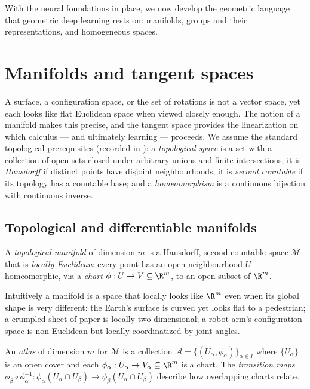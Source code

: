 With the neural foundations in place, we now develop the geometric language that
geometric deep learning rests on: manifolds, groups and their representations,
and homogeneous spaces.

\section{Manifolds and tangent spaces}
\label{sec:found:manifolds}

A surface, a configuration space, or the set of rotations is not a vector space,
yet each looks like flat Euclidean space when viewed closely enough. The notion
of a manifold makes this precise, and the tangent space provides the
linearization on which calculus --- and ultimately learning --- proceeds. We
assume the standard topological prerequisites (recorded in ): a
\emph{topological space} is a set with a collection of open sets closed under
arbitrary unions and finite intersections; it is \emph{Hausdorff} if distinct
points have disjoint neighbourhoods; it is \emph{second countable} if its
topology has a countable base; and a \emph{homeomorphism} is a continuous
bijection with continuous inverse.

\subsection{Topological and differentiable manifolds}
\label{sec:found:diff-manifolds}

\begin{definition}
\label{def:found:topmanifold}
A \emph{topological manifold} of dimension $m$ is a Hausdorff, second-countable
space $\mathcal{M}$ that is \emph{locally Euclidean}: every point has an open
neighbourhood $U$ homeomorphic, via a \emph{chart} $\phi : U \to V \subseteq
\R^m$, to an open subset of $\R^m$.
\end{definition}

Intuitively a manifold is a space that locally looks like $\R^m$ even when its
global shape is very different: the Earth's surface is curved yet looks flat to a
pedestrian; a crumpled sheet of paper is locally two-dimensional; a robot arm's
configuration space is non-Euclidean but locally coordinatized by joint angles.

\begin{definition}
\label{def:found:atlas}
An \emph{atlas} of dimension $m$ for $\mathcal{M}$ is a collection
$\mathcal{A} = \{(U_\alpha, \phi_\alpha)\}_{\alpha \in I}$ where
$\{U_\alpha\}$ is an open cover and each $\phi_\alpha : U_\alpha \to V_\alpha
\subseteq \R^m$ is a chart. The \emph{transition maps} $\phi_\beta \circ
\phi_\alpha^{-1} : \phi_\alpha(U_\alpha \cap U_\beta) \to \phi_\beta(U_\alpha \cap
U_\beta)$ describe how overlapping charts relate.
\end{definition}

